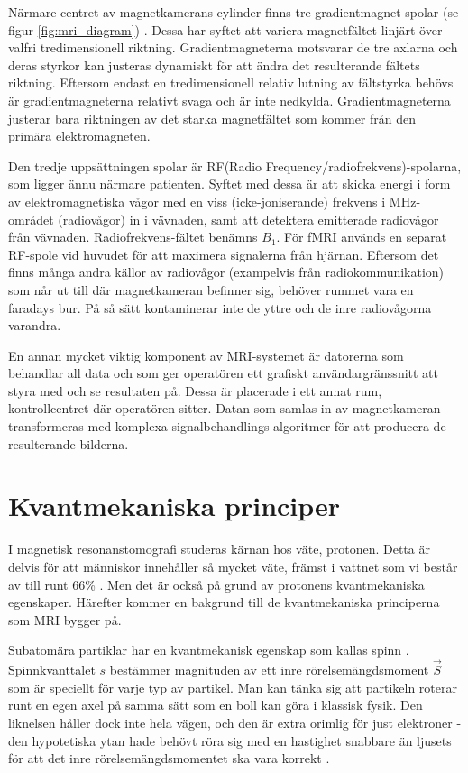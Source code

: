 \documentclass[11pt, a4paper]{article}
\begin{document}
Närmare centret av magnetkamerans cylinder finns tre gradient\-magnet-spolar (se figur \ref{fig:mri_diagram}) \parencite{understanding_mri}. Dessa har syftet att variera magnetfältet linjärt över valfri tredimensionell riktning. Gradientmagneterna motsvarar de tre axlarna och deras styrkor kan justeras dynamiskt för att ändra det resulterande fältets riktning. Eftersom endast en tredimensionell relativ lutning av fältstyrka behövs är gradientmagneterna relativt svaga och är inte nedkylda. Gradientmagneterna justerar bara riktningen av det starka magnetfältet som kommer från den primära elektromagneten.

Den tredje uppsättningen spolar är RF(Radio Frequency/radiofrekvens)-spolarna, som ligger ännu närmare patienten. Syftet med dessa är att skicka energi i form av elektromagnetiska vågor med en viss (icke-joniserande) frekvens i MHz-området (radiovågor) in i vävnaden, samt att detektera emitterade radiovågor från vävnaden. Radiofrekvens-fältet benämns $B_1$. För fMRI används en separat RF-spole vid huvudet för att maximera signalerna från hjärnan. Eftersom det finns många andra källor av radiovågor (exampelvis från radio\-kommunikation) som når ut till där magnetkameran befinner sig, behöver rummet vara en faradays bur. På så sätt kontaminerar inte de yttre och de inre radiovågorna varandra.

En annan mycket viktig komponent av MRI-systemet är datorerna som behandlar all data och som ger operatören ett grafiskt användargränssnitt att styra med och se resultaten på. Dessa är placerade i ett annat rum, kontrollcentret där operatören sitter. Datan som samlas in av magnetkameran transformeras med komplexa signalbehandlings-algoritmer för att producera de resulterande bilderna.

\clearpage
\section{Kvantmekaniska principer}
I magnetisk resonanstomografi studeras kärnan hos väte, protonen. Detta är delvis för att människor innehåller så mycket väte, främst i vattnet som vi består av till runt 66\% \parencite{mri_nobelpris_pressmeddelande}. Men det är också på grund av protonens kvantmekaniska egenskaper. Härefter kommer en bakgrund till de kvantmekaniska principerna som MRI bygger på.

Subatomära partiklar har en kvantmekanisk egenskap som kallas spinn \parencite{college_physics}. Spinnkvanttalet $s$ bestämmer magnituden av ett inre rörelsemängdsmoment $\vec{S}$ som är speciellt för varje typ av partikel. Man kan tänka sig att partikeln roterar runt en egen axel på samma sätt som en boll kan göra i klassisk fysik. Den liknelsen håller dock inte hela vägen, och den är extra orimlig för just elektroner - den hypotetiska ytan hade behövt röra sig med en hastighet snabbare än ljusets för att det inre rörelsemängdsmomentet ska vara korrekt \parencite{electron_spin}. 
\end{document}
